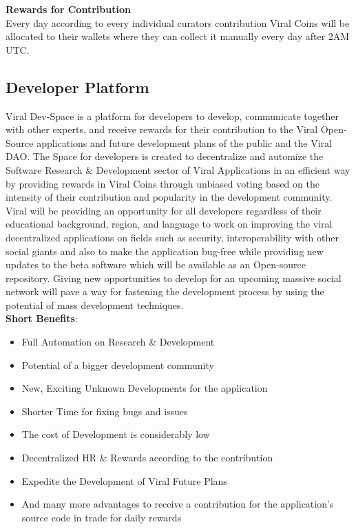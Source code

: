 \documentclass[10pt]{article}
\begin{document}
\textbf{Rewards for Contribution}\\

Every day according to every individual curators contribution Viral Coins will be allocated to their wallets where they can collect it manually every day after 2AM UTC. 


\subsection{Developer Platform}

Viral Dev-Space is a platform for developers to develop, communicate together with other experts, and receive rewards for their contribution to the Viral Open-Source applications and future development plans of the public and the Viral DAO. The Space for developers is created to decentralize and automize the Software Research \& Development sector of Viral Applications in an efficient way by providing rewards in Viral Coins through unbiased voting based on the intensity of their contribution and popularity in the development community.\\

Viral will be providing an opportunity for all developers regardless of their educational background, region, and language to work on improving the viral decentralized applications on fields such as security, interoperability with other social giants and also to make the application bug-free while providing new updates to the beta software which will be available as an Open-source repository. Giving new opportunities to develop for an upcoming massive social network will pave a way for fastening the development process by using the potential of mass development techniques.\\


\textbf{Short Benefits}:
\begin{itemize}[leftmargin=+0.2in]
\item Full Automation on Research \& Development
\item Potential of a bigger development community
\item New, Exciting Unknown Developments for the application
\item Shorter Time for fixing bugs and issues
\item The cost of Development is considerably low
\item Decentralized HR \& Rewards according to the contribution
\item Expedite the Development of Viral Future Plans
\item And many more advantages to receive a contribution for the application’s source code in trade for daily rewards
\end{itemize}
\end{document}
